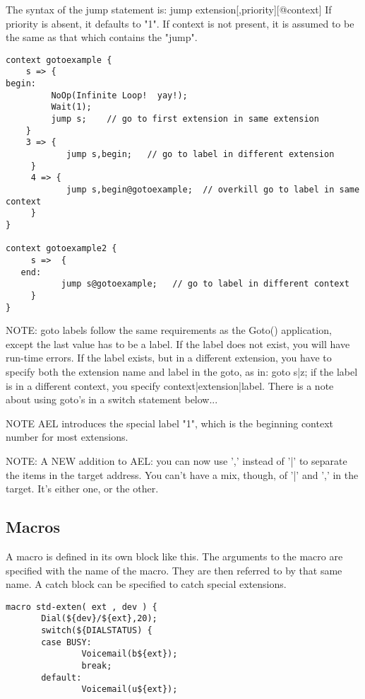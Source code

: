 {The syntax of the jump statement is: jump
extension[,priority][@context] If priority is absent, it defaults to
"1". If context is not present, it is assumed to be the same as that
which contains the "jump".

\begin{verbatim}
context gotoexample {
    s => {
begin:
         NoOp(Infinite Loop!  yay!);
         Wait(1);
         jump s;    // go to first extension in same extension
    }
    3 => {
            jump s,begin;   // go to label in different extension
     }
     4 => {
            jump s,begin@gotoexample;  // overkill go to label in same context
     }
}

context gotoexample2 {
     s =>  {
   end:
           jump s@gotoexample;   // go to label in different context
     }
}
\end{verbatim}

NOTE: goto labels follow the same requirements as the Goto()
      application, except the last value has to be a label. If the
      label does not exist, you will have run-time errors. If the
      label exists, but in a different extension, you have to specify
      both the extension name and label in the goto, as in: goto s|z;
      if the label is in a different context, you specify
      context|extension|label. There is a note about using goto's in a
      switch statement below...

NOTE  AEL introduces the special label "1", which is the beginning
      context number for most extensions.

NOTE: A NEW addition to AEL: you can now use ',' instead of '|' to
      separate the items in the target address. You can't have a mix,
      though, of '|' and ',' in the target. It's either one, or the other.




\subsection{Macros}

A macro is defined in its own block like this. The arguments to the
macro are specified with the name of the macro. They are then referred
to by that same name. A catch block can be specified to catch special
extensions.

\begin{verbatim}
macro std-exten( ext , dev ) {
       Dial(${dev}/${ext},20);
       switch(${DIALSTATUS) {
       case BUSY:
               Voicemail(b${ext});
               break;
       default:
               Voicemail(u${ext});


\end{verbatim}}
